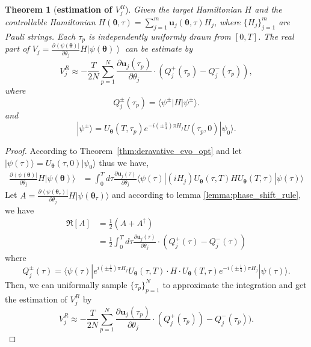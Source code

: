 \documentclass[twocolumn,
pra,aps,superscriptaddress,showpacs,amsmath,amssymb]{revtex4-2}
\newtheorem{theorem}{Theorem}
\begin{document}
\begin{theorem}[{\bf{estimation of $V_{j}^R$}}]\label{thm:V_R}
 Given the target Hamiltonian $H$ and the controllable Hamiltonian $H(\bm{\theta},\tau)=\sum_{j=1}^m \bm{u}_j(\bm{\theta},\tau)H_j$, where $\{H_j\}_{j=1}^m$ are Pauli strings. Each $\tau_p$ is independently uniformly drawn from $[0,T]$. The real part of $V_{j}=\frac{\partial\left\langle\psi(\bm{\theta})\right|}{\partial\theta_{j}}H\left|\psi(\bm{\theta})\right\rangle$ can be estimate by
 \begin{equation}
 V_{j}^R \approx -\frac{T}{2N}\sum_{p=1}^N \frac{\partial{\bm{u}_j}(\tau_p)}{\partial{\theta_j}} \cdot \left(Q_{j}^{+}(\tau_p) - Q_{j}^{-}(\tau_p)\right), 
 \end{equation}
 where
 \begin{equation}
 Q_{j}^{\pm}(\tau_p) = \langle \psi^{\pm}|H|\psi^{\pm}\rangle.
 \end{equation}
 and
 \begin{equation}
 |\psi^{\pm}\rangle = U_{\bm{\theta}}(T,\tau_p) e^{-i(\pm\frac{1}{4})\pi H_j}U(\tau_p,0)|\psi_0\rangle.
 \end{equation}
\end{theorem}

\begin{proof}
According to Theorem~\ref{thm:deravative_evo_opt} and let $|\psi(\tau) \rangle = U_{\bm{\theta}}(\tau,0)|\psi_0\rangle$ thus we have,
\begin{align}
\frac{\partial\left\langle\psi(\bm{\theta})\right|}{\partial\theta_{j}}H|\psi(\bm{\theta})\rangle & = \int_{0}^T d\tau \frac{\partial \bm{u}_j(\tau)}{\partial \theta_j}\langle \psi(\tau)|(iH_j)U_{\bm{\theta}}(\tau,T)HU_{\bm{\theta}}(T,\tau)|\psi(\tau)\rangle
\end{align}
Let $A = \frac{\partial\left\langle\psi(\bm{\theta}_\tau)\right|}{\partial\theta_{j}}H|\psi(\bm{\theta}_\tau)\rangle $ and according to lemma \ref{lemma:phase_shift_rule}, we have
\begin{align}
\Re[A] &= \frac{1}{2}(A+A^\dagger)\\
& = \frac{1}{2}\int_{0}^T d\tau \frac{\partial \bm{u}_j(\tau)}{\partial \theta_j}\cdot \left(Q_{j}^{+}(\tau) - Q_{j}^{-}(\tau)\right)
\end{align}
where
\begin{equation}
Q_{j}^{\pm}(\tau) = \langle \psi(\tau)| e^{i(\pm\frac{1}{4})\pi H_j}U_{\bm{\theta}}(\tau,T)\cdot H \cdot U_{\bm{\theta}}(T,\tau) e^{-i(\pm\frac{1}{4})\pi H_j}|\psi(\tau)\rangle.
\end{equation}
Then, we can uniformally sample $\{\tau_p\}_{p=1}^N$ to approximate the integration and get the estimation of $V_j^R$ by
\begin{equation}
V_{j}^R  \approx -\frac{T}{2N}\sum_{p=1}^N \frac{\partial{\bm{u}_j}(\tau_p)}{\partial{\theta_j}} \cdot (Q_{j}^{+}(\tau_p)) - Q_{j}^{-}(\tau_p)).
\end{equation}
\end{proof}
\end{document}
